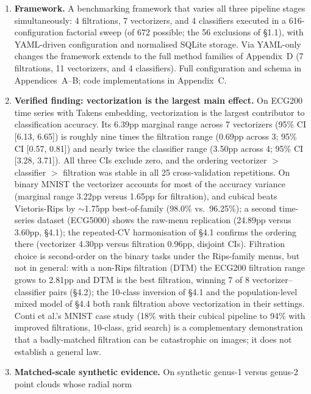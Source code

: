 \documentclass[12pt, a4paper]{report}
\theoremstyle{definition}
\theoremstyle{plain}
\theoremstyle{remark}
\begin{document}
\begin{enumerate}
  \item \textbf{Framework.} A benchmarking framework that varies all
    three pipeline stages simultaneously: 4 filtrations, 7
    vectorizers, and 4 classifiers executed in a 616-configuration
    factorial sweep (of 672 possible; the 56 exclusions of \S1.1),
    with YAML-driven configuration and normalised SQLite
    storage. Via YAML-only changes the framework extends to the full
    method families of Appendix~D (7 filtrations, 11 vectorizers,
    and 4 classifiers). Full
    configuration and schema in Appendices~A--B; code
    implementations in Appendix~C.
  \item \textbf{Verified finding: vectorization is the largest main effect.} On ECG200
    time series with Takens embedding, vectorization is the largest
    contributor to classification accuracy. Its 6.39pp marginal range
    across 7 vectorizers (95\% CI [6.13, 6.65]) is roughly nine times
    the filtration range (0.69pp across 3; 95\% CI [0.57, 0.81]) and
    nearly twice the classifier range (3.50pp across 4; 95\% CI
    [3.28, 3.71]). All three CIs exclude zero, and the ordering
    vectorizer $>$ classifier $>$ filtration was stable in all 25
    cross-validation repetitions.
    On binary MNIST the vectorizer accounts for most of the accuracy variance (marginal range
    3.22pp versus 1.65pp for filtration), and cubical beats
    Vietoris-Rips by $\sim$1.75pp best-of-family (98.0\% vs.\
    96.25\%); a second time-series dataset (ECG5000) shows the raw-menu
    replication (24.89pp versus 3.60pp, \S4.1); the repeated-CV
    harmonisation of \S4.1 confirms the ordering there (vectorizer 4.30pp
    versus filtration 0.96pp, disjoint CIs). Filtration choice is second-order on the binary tasks under the
    Rips-family menus, but not in general: with a non-Rips filtration
    (DTM) the ECG200 filtration range grows to 2.81pp and DTM is the
    best filtration, winning 7 of 8 vectorizer--classifier pairs
    (\S4.2); the 10-class inversion of \S4.1 and the population-level
    mixed model of \S4.4 both rank filtration above vectorization in
    their settings. Conti et
    al.'s MNIST case study (18\% with their cubical
    pipeline to 94\% with improved filtrations, 10-class, grid
    search) is a complementary demonstration that a badly-matched
    filtration can be catastrophic on images; it does not establish a
    general law.
  \item \textbf{Matched-scale synthetic evidence.} On synthetic
    genus-1 versus genus-2 point clouds whose radial norm

\end{enumerate}
\end{document}
